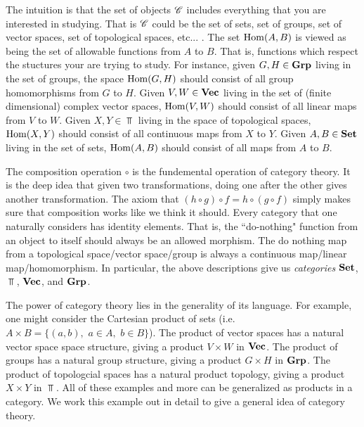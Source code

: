 \documentclass{article}
\theoremstyle{definition}
\numberwithin{figure}{section}
\begin{document}
The intuition is that the set of objects $\mathscr{C}$ includes everything that you are interested in studying. That is $\mathscr{C}$ could be the set of sets, set of groups, set of vector spaces, set of topological spaces, etc... . The set $\mathrm{Hom}(A,B)$ is viewed as being the set of allowable functions from $A$ to $B$. That is, functions which respect the stuctures your are trying to study. For instance, given $G,H\in \bold{Grp}$ living in the set of groups, the space $\mathrm{Hom}(G,H)$ should consist of all group homomorphisms from $G$ to $H$. Given $V,W\in \bold{Vec}$ living in the set of (finite dimensional) complex vector spaces, $\mathrm{Hom}(V,W)$ should consist of all linear maps from $V$ to $W$. Given $X,Y\in \Top$ living in the space of topological spaces, $\mathrm{Hom}(X,Y)$ should consist of all continuous maps from $X$ to $Y$. Given $A,B\in \bold{Set}$ living in the set of sets, $\mathrm{Hom}(A,B)$ should consist of all maps from $A$ to $B$.

The composition operation $\circ$ is the fundemental operation of category theory. It is the deep idea that given two transformations, doing one after the other gives another transformation. The axiom that $(h\circ g)\circ f = h\circ (g\circ f)$ simply makes sure that composition works like we think it should. Every category that one naturally considers has identity elements. That is, the ``do-nothing" function from an object to itself should always be an allowed morphism. The do nothing map from a topological space/vector space/group is always a continuous map/linear map/homomorphism. In particular, the above descriptions give us \textit{categories} $\bold{Set}$, $\Top$, $\bold{Vec}$, and $\bold{Grp}$.

The power of category theory lies in the generality of its language. For example, one might consider the Cartesian product of sets (i.e. $A\times B=\{(a,b),\,\, a\in A,\,\, b\in B\}$). The product of vector spaces has a natural vector space space structure, giving a product $V\times W$ in $\bold{Vec}$. The product of groups has a natural group structure, giving a product $G\times H$ in $\bold{Grp}$. The product of topologcial spaces has a natural product topology, giving a product $X\times Y$ in $\Top$. All of these examples and more can be generalized as products in a category. We work this example out in detail to give a general idea of category theory.
\end{document}
